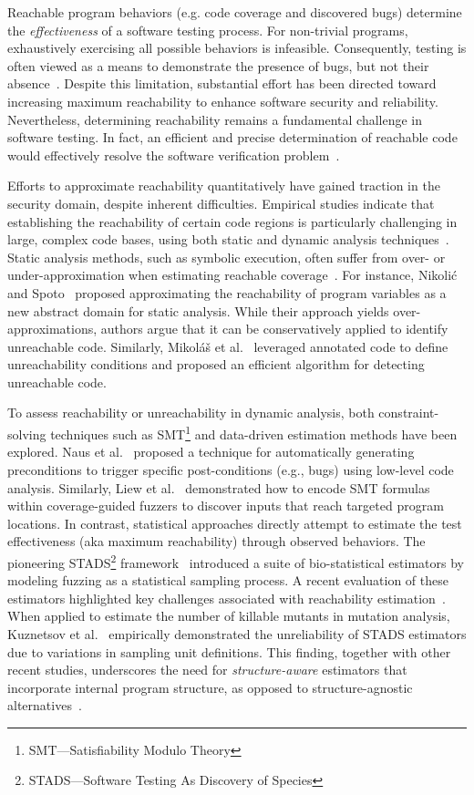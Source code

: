 \documentclass[conference]{IEEEtran}
\begin{document}
Reachable program behaviors (e.g. code coverage and discovered bugs) determine the \emph{effectiveness} of a software testing process. For non-trivial programs, exhaustively exercising all possible behaviors is infeasible. Consequently, testing is often viewed as a means to demonstrate the presence of bugs, but not their absence~\cite{dijkstra2022reliability}. Despite this limitation, substantial effort has been directed toward increasing maximum reachability to enhance software security and reliability. Nevertheless, determining reachability remains a fundamental challenge in software testing. In fact, an efficient and precise determination of reachable code would effectively resolve the software verification problem~\cite{reachability_2023}. 

Efforts to approximate reachability quantitatively have gained traction in the security domain, despite inherent difficulties. Empirical studies indicate that establishing the reachability of certain code regions is particularly challenging in large, complex code bases, using both static and dynamic analysis techniques~\cite{reachability_questions}. Static analysis methods, such as symbolic execution, often suffer from over- or under-approximation when estimating reachable coverage~\cite{reachability_2023,Aniche2015}. For instance, Nikoli\'{c} and Spoto~\cite{reachability_program_vars} proposed approximating the reachability of program variables as a new abstract domain for static analysis. While their approach yields over-approximations, authors argue that it can be conservatively applied to identify unreachable code. Similarly, Mikol\'{a}\v{s} et al.~\cite{annotate_reachability} leveraged annotated code to define unreachability conditions and proposed an efficient algorithm for detecting unreachable code.

To assess reachability or unreachability in dynamic analysis, both constraint-solving techniques such as SMT\footnote{SMT—Satisfiability Modulo Theory} and data-driven estimation methods have been explored. Naus et al.~\cite{naus2023low} proposed a technique for automatically generating preconditions to trigger specific post-conditions (e.g., bugs) using low-level code analysis. Similarly, Liew et al.~\cite{Liew2019} demonstrated how to encode SMT formulas within coverage-guided fuzzers to discover inputs that reach targeted program locations. In contrast, statistical approaches directly attempt to estimate the test effectiveness (aka maximum reachability) through observed behaviors. The pioneering STADS\footnote{STADS—Software Testing As Discovery of Species} framework~\cite{stads} introduced a suite of bio-statistical estimators by modeling fuzzing as a statistical sampling process. A recent evaluation of these estimators highlighted key challenges associated with reachability estimation~\cite{reachability_2023}. When applied to estimate the number of killable mutants in mutation analysis, Kuznetsov et al.~\cite{killable} empirically demonstrated the unreliability of STADS estimators due to variations in sampling unit definitions. This finding, together with other recent studies, underscores the need for \emph{structure-aware} estimators that incorporate internal program structure, as opposed to structure-agnostic alternatives~\cite{statreachability_2023}.
\end{document}
